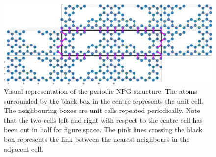 \begin{figure}[H]
	\centering
	\includegraphics[width=\textwidth]{Figures/representativestructure2.eps}
	\caption{Visual representation of the periodic NPG-structure. The atoms surrounded by the black box in the centre represents the unit cell. The neighbouring boxes are unit cells repeated periodically. Note that the two cells left and right with respect to the centre cell has been cut in half for figure space. The pink lines crossing the black box represents the link between the nearest neighbours in the adjacent cell.}
	\label{atomrepfig}
\end{figure}
